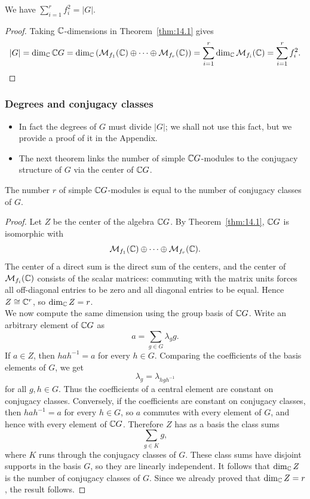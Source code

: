 \documentclass[../Odyssey_Project.tex]{subfiles}
\begin{document}
\begin{corollary}
\label{cor:14.2}
We have $\sum\limits_{i=1}^{r} f_i^2 = |G|$.
\end{corollary}
\begin{proof}
    Taking $\mathbb{C}$-dimensions in Theorem~\ref{thm:14.1} gives
    \[
        |G|=\dim_{\mathbb{C}}\mathbb{C} G
        =
        \dim_{\mathbb{C}}\left(\mathcal{M}_{f_1}(\mathbb{C}) \oplus \cdots \oplus \mathcal{M}_{f_r}(\mathbb{C})\right)
        =
        \sum_{i=1}^{r}\dim_{\mathbb{C}}\mathcal{M}_{f_i}(\mathbb{C})
        =
        \sum_{i=1}^{r}f_i^2.
    \]
\end{proof}

\subsubsection*{Degrees and conjugacy classes}
\begin{itemize}
    \item In fact the degrees of $G$ must divide $|G|$; we shall not use this fact, but we provide a proof of it in the Appendix.
    \item The next theorem links the number of simple $\mathbb{C} G$-modules to the conjugacy structure of $G$ via the center of $\mathbb{C} G$.
\end{itemize}

\begin{theorem}
\label{thm:14.3}
The number $r$ of simple $\mathbb{C} G$-modules is equal to the number of conjugacy classes of $G$.
\end{theorem}
\begin{proof}
    Let $Z$ be the center of the algebra $\mathbb{C} G$. By Theorem~\ref{thm:14.1}, $\mathbb{C} G$ is isomorphic with
    \[
        \mathcal{M}_{f_1}(\mathbb{C}) \oplus \cdots \oplus \mathcal{M}_{f_r}(\mathbb{C}).
    \]
    The center of a direct sum is the direct sum of the centers, and the center of $\mathcal{M}_{f_i}(\mathbb{C})$ consists of the scalar matrices: commuting with the matrix units forces all off-diagonal entries to be zero and all diagonal entries to be equal. Hence $Z \cong \mathbb{C}^r$, so $\dim_{\mathbb{C}}Z=r$.\\
    We now compute the same dimension using the group basis of $\mathbb{C} G$. Write an arbitrary element of $\mathbb{C} G$ as
    \[
        a=\sum_{g \in G}\lambda_g g.
    \]
    If $a \in Z$, then $h a h^{-1}=a$ for every $h \in G$. Comparing the coefficients of the basis elements of $G$, we get
    \[
        \lambda_g=\lambda_{hgh^{-1}}
    \]
    for all $g,h \in G$. Thus the coefficients of a central element are constant on conjugacy classes. Conversely, if the coefficients are constant on conjugacy classes, then $h a h^{-1}=a$ for every $h \in G$, so $a$ commutes with every element of $G$, and hence with every element of $\mathbb{C} G$. Therefore $Z$ has as a basis the class sums
    \[
        \sum_{g \in K}g,
    \]
    where $K$ runs through the conjugacy classes of $G$. These class sums have disjoint supports in the basis $G$, so they are linearly independent. It follows that $\dim_{\mathbb{C}}Z$ is the number of conjugacy classes of $G$. Since we already proved that $\dim_{\mathbb{C}}Z=r$, the result follows.
\end{proof}
\end{document}
